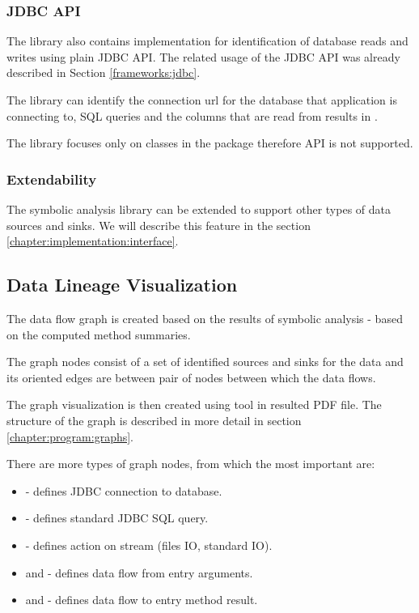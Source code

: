 \subsubsection{JDBC API}

The library also contains implementation for identification of
database reads and writes using plain JDBC API.
The related usage of the JDBC API was already described in Section \ref{frameworks:jdbc}.

The library can identify the connection url for the database
that application is connecting to, SQL queries and the columns
that are read from results in .

The library focuses only on classes in the package 
therefore  API is not supported.



\subsubsection{Extendability}

The symbolic analysis library can be extended to support other types
of data sources and sinks. We will describe this feature in the section \ref{chapter:implementation:interface}.



\subsection{Data Lineage Visualization}

The data flow graph is created based on the results of symbolic analysis - based on
the computed method summaries.

The graph nodes consist of a set of identified sources and sinks for the data
and its oriented edges are between pair of nodes between which the data flows.

The graph visualization is then created using \citet{Graphviz} tool in resulted PDF file.
The structure of the graph is described in more detail in section \ref{chapter:program:graphs}.

There are more types of graph nodes, from which the most important are:
\begin{itemize}
  \item {} - defines JDBC connection to database.
  \item {} - defines standard JDBC SQL query.
  \item {} - defines action on stream (files IO, standard IO).
  \item {} and  - defines data flow from entry arguments.
  \item {} and  - defines data flow to entry method result.
\end{itemize}

